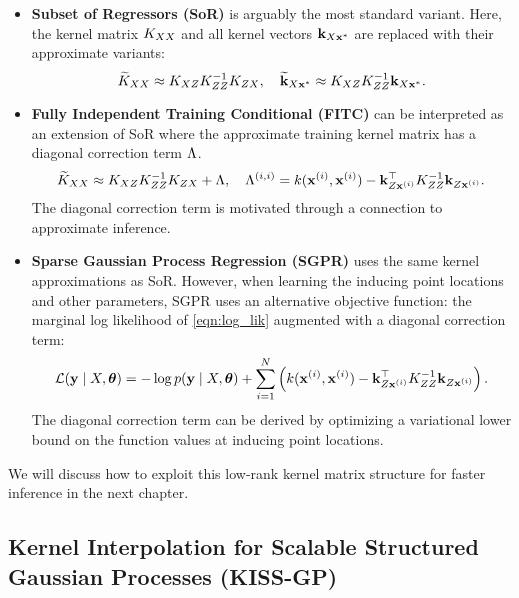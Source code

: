 \begin{itemize}
	\item {\bf Subset of Regressors (SoR)} \cite{silverman1985some,smola2001sparse} is arguably the most standard variant.
    Here, the kernel matrix $K_{XX}$ and all kernel vectors $\mathbf{k}_{X\mathbf{x}^*}$ are replaced with their approximate variants:
    \[ \widetilde {K}_{XX} \approx K_{XZ} K_{ZZ}^{-1} K_{ZX}, \quad
       \widetilde {\mathbf{k}}_{X\mathbf{x}^*} \approx K_{XZ} K_{ZZ}^{-1} \mathbf{k}_{X\mathbf{x}^*}. \]

	\item {\bf Fully Independent Training Conditional (FITC) } \cite{snelson2006sparse} can be interpreted as an extension of SoR
		where the approximate training kernel matrix has a diagonal correction term $\Lambda$.
    \[ \widetilde {K}_{XX} \approx K_{XZ} K_{ZZ}^{-1} K_{ZX} + \Lambda, \quad
       \Lambda^{(i,i)} = k(\mathbf{x}^{(i)}, \mathbf{x}^{(i)}) - \mathbf{k}_{Z\mathbf{x}^{(i)}}^\top K_{ZZ}^{-1} \mathbf{k}_{Z\mathbf{x}^{(i)}}. \]
    The diagonal correction term is motivated through a connection to approximate inference.

	\item {\bf Sparse Gaussian Process Regression (SGPR) } \cite{titsias2009variational} uses the same kernel approximations as SoR.
		However, when learning the inducing point locations and other parameters, SGPR uses an alternative objective function:
		the marginal log likelihood of \cref{eqn:log_lik} augmented with a diagonal correction term:
    \[ \mathcal L(\mathbf{y} \mid X, \boldsymbol{\theta}) = -\log p(\mathbf{y} \mid X, \boldsymbol{\theta}) + \sum_{i=1}^N \left( k(\mathbf{x}^{(i)}, \mathbf{x}^{(i)}) - \mathbf{k}_{Z\mathbf{x}^{(i)}}^\top K_{ZZ}^{-1} \mathbf{k}_{Z\mathbf{x}^{(i)}} \right). \]
    The diagonal correction term can be derived by optimizing a variational lower bound on the function values at inducing point locations.
\end{itemize}
%
We will discuss how to exploit this low-rank kernel matrix structure for faster inference in the next chapter.


\subsection{Kernel Interpolation for Scalable Structured Gaussian Processes (KISS-GP)}
\label{sec:kissgp}

